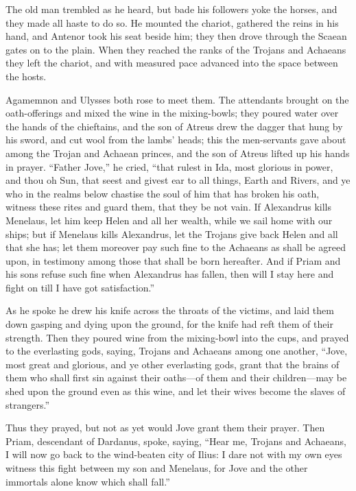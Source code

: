 The old man trembled as he heard, but bade his followers yoke the horses,
and they made all haste to do so. He mounted the chariot, gathered the
reins in his hand, and Antenor took his seat beside him; they then drove
through the Scaean gates on to the plain. When they reached the ranks of
the Trojans and Achaeans they left the chariot, and with measured pace
advanced into the space between the hosts.

Agamemnon and Ulysses both rose to meet them. The attendants brought on
the oath-offerings and mixed the wine in the mixing-bowls; they poured
water over the hands of the chieftains, and the son of Atreus drew the
dagger that hung by his sword, and cut wool from the lambs’ heads; this
the men-servants gave about among the Trojan and Achaean princes, and the
son of Atreus lifted up his hands in prayer. “Father Jove,” he cried,
“that rulest in Ida, most glorious in power, and thou oh Sun, that seest
and givest ear to all things, Earth and Rivers, and ye who in the realms
below chastise the soul of him that has broken his oath, witness these
rites and guard them, that they be not vain. If Alexandrus kills Menelaus,
let him keep Helen and all her wealth, while we sail home with our ships;
but if Menelaus kills Alexandrus, let the Trojans give back Helen and all
that she has; let them moreover pay such fine to the Achaeans as shall be
agreed upon, in testimony among those that shall be born hereafter. And if
Priam and his sons refuse such fine when Alexandrus has fallen, then will
I stay here and fight on till I have got satisfaction.”

As he spoke he drew his knife across the throats of the victims, and laid
them down gasping and dying upon the ground, for the knife had reft them
of their strength. Then they poured wine from the mixing-bowl into the
cups, and prayed to the everlasting gods, saying, Trojans and Achaeans
among one another, “Jove, most great and glorious, and ye other
everlasting gods, grant that the brains of them who shall first sin
against their oaths—of them and their children—may be shed
upon the ground even as this wine, and let their wives become the slaves
of strangers.”

Thus they prayed, but not as yet would Jove grant them their prayer. Then
Priam, descendant of Dardanus, spoke, saying, “Hear me, Trojans and
Achaeans, I will now go back to the wind-beaten city of Ilius: I dare not
with my own eyes witness this fight between my son and Menelaus, for Jove
and the other immortals alone know which shall fall.”

